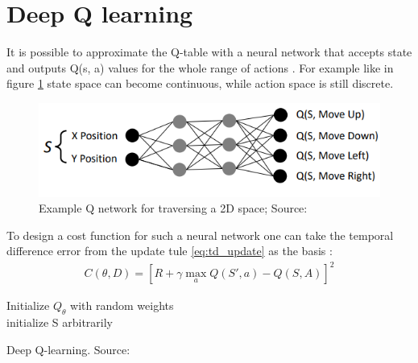 \section{Deep Q learning}

It is possible to approximate the Q-table with a neural network that accepts state and outputs Q(s, a) 
values for the whole range of actions \cite{lecture_intro_to_deep_rl}. For example like in 
figure \ref{fig:q_network} state space can become continuous, while action space is still discrete.

\begin{figure}[H]
  \centering
  \includegraphics[scale=0.5]{figures/q_network.PNG}
  \caption{Example Q network for traversing a 2D space; Source: \cite{lecture_intro_to_deep_rl}}
  \label{fig:q_network}
\end{figure}

To design a cost function for such a neural network 
one can take the temporal difference error from the update tule \ref{eq:td_update} as the basis \cite{lecture_intro_to_deep_rl}:
\begin{align}
    C(\theta, D) = [R + \gamma \max_a Q(S', a) - Q(S, A)]^2
\end{align}

\begin{algorithm}[H]
\SetAlgoLined
Initialize $Q_{\theta}$ with random weights \theta \; \\
initialize S arbitrarily\;\\
\caption{Deep Q-learning. Source: \cite{lecture_dqn} }
\end{algorithm}\\

